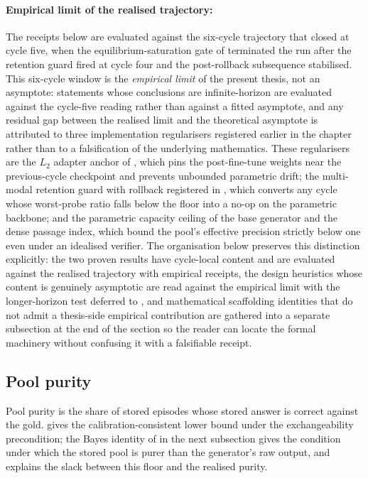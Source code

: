 \paragraph{Empirical limit of the realised trajectory:} The receipts below are evaluated against the six-cycle trajectory that closed at cycle five, when the equilibrium-saturation gate of  terminated the run after the retention guard fired at cycle four and the post-rollback subsequence stabilised. This six-cycle window is the \emph{empirical limit} of the present thesis, not an asymptote: statements whose conclusions are infinite-horizon are evaluated against the cycle-five reading rather than against a fitted asymptote, and any residual gap between the realised limit and the theoretical asymptote is attributed to three implementation regularisers registered earlier in the chapter rather than to a falsification of the underlying mathematics. These regularisers are the $L_2$ adapter anchor of , which pins the post-fine-tune weights near the previous-cycle checkpoint and prevents unbounded parametric drift; the multi-modal retention guard with rollback registered in , which converts any cycle whose worst-probe ratio falls below the floor into a no-op on the parametric backbone; and the parametric capacity ceiling of the base generator and the dense passage index, which bound the pool's effective precision strictly below one even under an idealised verifier. The organisation below preserves this distinction explicitly: the two proven results have cycle-local content and are evaluated against the realised trajectory with empirical receipts, the design heuristics whose content is genuinely asymptotic are read against the empirical limit with the longer-horizon test deferred to , and mathematical scaffolding identities that do not admit a thesis-side empirical contribution are gathered into a separate subsection at the end of the section so the reader can locate the formal machinery without confusing it with a falsifiable receipt.

\subsection{Pool purity}
\label{sec:theorem-purity}

Pool purity is the share of stored episodes whose stored answer is correct against the gold.  gives the calibration-consistent lower bound under the exchangeability precondition; the Bayes identity of  in the next subsection gives the condition under which the stored pool is purer than the generator's raw output, and explains the slack between this floor and the realised purity.

